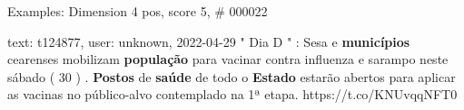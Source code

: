 \begin{frame}{Examples: Dimension 4 pos, score 5, \# 000022}
\footnotesize
\begin{exampleblock}{text: t124877, user: unknown, 2022-04-29}
" Dia D " : Sesa e \textbf{municípios} cearenses mobilizam \textbf{população} 
para vacinar contra influenza e sarampo neste sábado ( 30 ) . \textbf{Postos} 
de \textbf{saúde} de todo o \textbf{Estado} estarão abertos para aplicar as 
vacinas no público-alvo contemplado na 1ª etapa. https://t.co/KNUvqqNFT0 
\end{exampleblock}
\end{frame}
